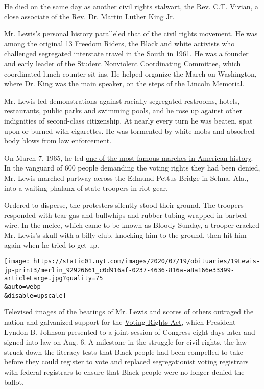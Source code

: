He died on the same day as another civil rights stalwart,
\href{https://www.nytimes.com/2020/07/17/us/ct-vivian-dead.html}{the
Rev. C.T. Vivian}, a close associate of the Rev. Dr. Martin Luther King
Jr.

Mr. Lewis's personal history paralleled that of the civil rights
movement. He was
\href{https://www.nytimes.com/2020/07/18/us/freedom-riders-john-lewis-work.html}{among
the original 13 Freedom Riders}, the Black and white activists who
challenged segregated interstate travel in the South in 1961. He was a
founder and early leader of the \href{https://snccdigital.org/}{Student
Nonviolent Coordinating Committee}, which coordinated lunch-counter
sit-ins. He helped organize the March on Washington, where Dr. King was
the main speaker, on the steps of the Lincoln Memorial.

Mr. Lewis led demonstrations against racially segregated restrooms,
hotels, restaurants, public parks and swimming pools, and he rose up
against other indignities of second-class citizenship. At nearly every
turn he was beaten, spat upon or burned with cigarettes. He was
tormented by white mobs and absorbed body blows from law enforcement.

On March 7, 1965, he led
\href{https://www.archives.gov/exhibits/eyewitness/html.php?section=2}{one
of the most famous marches in American history}. In the vanguard of 600
people demanding the voting rights they had been denied, Mr. Lewis
marched partway across the Edmund Pettus Bridge in Selma, Ala., into a
waiting phalanx of state troopers in riot gear.

Ordered to disperse, the protesters silently stood their ground. The
troopers responded with tear gas and bullwhips and rubber tubing wrapped
in barbed wire. In the melee, which came to be known as Bloody Sunday, a
trooper cracked Mr. Lewis's skull with a billy club, knocking him to the
ground, then hit him again when he tried to get up.

\texttt{[image: https://static01.nyt.com/images/2020/07/19/obituaries/19Lewis-jp-print3/merlin\_92926661\_c0d916af-0237-4636-816a-a8a166e33399-articleLarge.jpg?quality=75\\\&auto=webp\\\&disable=upscale]}

Televised images of the beatings of Mr. Lewis and scores of others
outraged the nation and galvanized support for the
\href{https://www.ourdocuments.gov/doc.php?flash=true\&doc=100}{Voting
Rights Act}, which President Lyndon B. Johnson presented to a joint
session of Congress eight days later and signed into law on Aug. 6. A
milestone in the struggle for civil rights, the law struck down the
literacy tests that Black people had been compelled to take before they
could register to vote and replaced segregationist voting registrars
with federal registrars to ensure that Black people were no longer
denied the ballot.

